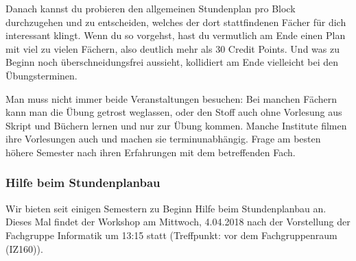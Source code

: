 \begin{multicols}{2}
		Danach kannst du probieren den allgemeinen Stundenplan pro Block durchzugehen und zu entscheiden, welches der dort stattfindenen Fächer für dich interessant klingt. Wenn du so vorgehst, hast du vermutlich am Ende einen Plan mit viel zu vielen Fächern, also deutlich mehr als 30 Credit Points. Und was zu Beginn noch überschneidungsfrei aussieht, kollidiert am Ende vielleicht bei den Übungsterminen. 

		Man muss nicht immer beide Veranstaltungen besuchen: Bei manchen Fächern kann man die Übung getrost weglassen, oder den Stoff auch ohne Vorlesung aus Skript und Büchern lernen und nur zur Übung kommen. Manche Institute filmen ihre Vorlesungen auch und machen sie terminunabhängig. Frage am besten höhere Semester nach ihren Erfahrungen mit dem betreffenden Fach.

	\subsubsection{Hilfe beim Stundenplanbau}
		Wir bieten seit einigen Semestern zu Beginn Hilfe beim Stundenplanbau an. Dieses Mal findet der Workshop am Mittwoch, 4.04.2018 nach der Vorstellung der Fachgruppe Informatik um 13:15 statt (Treffpunkt: vor dem Fachgruppenraum (IZ160)). 
\end{multicols}
